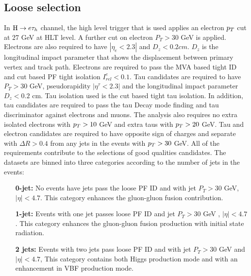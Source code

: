 \subsection{Loose selection}
In $ \mathrm{H} \to e \tau_{h}$ channel, the high level trigger that is used applies an electron $p_{T}$ cut at 27 GeV at HLT level. A further cut on electron $P_{T}>30$ GeV is applied. Electrons are also required to have $|\eta_{e}<2.3|$ and $D_{z}<0.2 cm$. $D_{z}$ is the longitudinal impact parameter that shows the displacement between primary vertex and track path. Electrons are required to pass the MVA based tight ID and cut based PF tight isolation  $I_{rel}^{e}<0.1$. Tau candidates are required to have $P_{T}>30$ GeV, pseudorapidity $|\eta^{\tau}<2.3|$ and the longitudinal impact parameter $D_{z}<0.2$ cm. Tau isolation used is the cut based tight tau isolation. In addition, tau candidates are required to pass the tau Decay mode finding and tau discriminator against electrons and muons. The analysis also requires no extra isolated electrons with $p_{T}>10$ GeV and extra taus with $p_{T}>20$ GeV. Tau and electron candidates are required to have opposite sign of charges and separate with $\Delta R>0.4$ from any jets in the events with $p_{T}>30$ GeV. All of the requirements contribute to the selections of good qualities candidates. The datasets are binned into three categories according to the number of jets in the events:
\begin{enumerate}
\item[{\bf 0-jet:}] No events have jets pass the loose PF ID and  with jet $P_T>30$ GeV, $|\eta|<4.7$. This category enhances the gluon-gluon fusion contribution.
\item[{\bf 1-jet:}] Events with one jet passes loose PF ID and jet $P_T>30$ GeV , $|\eta|<4.7$. This category enhances the gluon-gluon fusion production with initial state radiation.
\item [{\bf 2 jets:}] Events with two jets pass loose PF ID and with jet $P_T>30$ GeV and $|\eta|<4.7$, This category contains both Higgs production mode and with an enhancement in VBF production mode. \end{enumerate}

